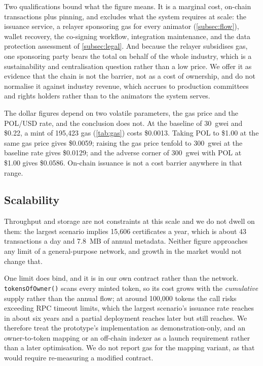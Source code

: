 Two qualifications bound what the figure means. It is a marginal cost, on-chain
transactions plus pinning, and excludes what the system requires at scale: the issuance
service, a relayer sponsoring gas for every animator (\cref{subsec:flow}), wallet
recovery, the co-signing workflow, integration maintenance, and the data protection
assessment of \cref{subsec:legal}. And because the relayer subsidises gas, one sponsoring
party bears the total on behalf of the whole industry, which is a sustainability and
centralisation question rather than a low price. We offer it as evidence that the chain is
not the barrier, not as a cost of ownership, and do not normalise it against industry
revenue, which accrues to production committees and rights holders rather than to the
animators the system serves.

The dollar figures depend on two volatile parameters, the gas price and the POL/USD
rate, and the conclusion does not. At the baseline of 30~gwei and \$0.22, a mint of
195{,}423 gas (\cref{tab:gas}) costs \$0.0013. Taking POL to \$1.00 at the same gas
price gives \$0.0059; raising the gas price tenfold to 300~gwei at the baseline rate
gives \$0.0129; and the adverse corner of 300~gwei with POL at \$1.00 gives \$0.0586.
On-chain issuance is not a cost barrier anywhere in that range.

\subsection{Scalability}
\label{subsec:scalability}

Throughput and storage are not constraints at this scale and we do not dwell on them:
the largest scenario implies 15{,}606 certificates a year, which is about 43
transactions a day and 7.8~MB of annual metadata. Neither figure
approaches any limit of a general-purpose network, and growth in the market would not
change that.

One limit does bind, and it is in our own contract rather than the network.
\texttt{tokensOfOwner()} scans every minted token, so its cost grows with the
\emph{cumulative} supply rather than the annual flow; at around 100{,}000 tokens
the call risks exceeding RPC timeout limits, which the largest scenario's issuance rate
reaches in about six years and a partial deployment reaches later but still reaches. We therefore treat the prototype's
implementation as demonstration-only, and an owner-to-token mapping or an
off-chain indexer as a launch requirement rather than a later optimisation. We do
not report gas for the mapping variant, as that would require re-measuring a
modified contract.

